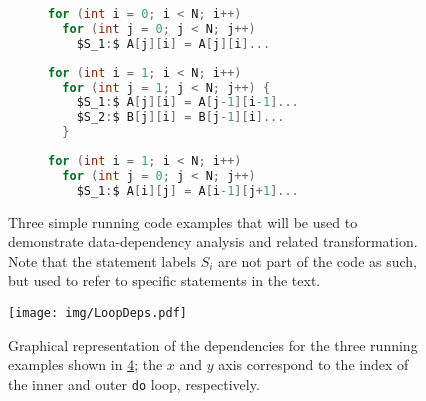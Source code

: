 \begin{figure}
  \centering

  \begin{subfigure}[b]{0.45\textwidth}
\begin{lstlisting}[language=C,mathescape=True]
for (int i = 0; i < N; i++)
  for (int j = 0; j < N; j++)
    $S_1:$ A[j][i] = A[j][i]...
\end{lstlisting}
    \caption{}
    \label{fig:data-dep-running-eg-a}
  \end{subfigure}

  \begin{subfigure}[b]{0.45\textwidth}
\begin{lstlisting}[language=C,mathescape=True]
for (int i = 1; i < N; i++)
  for (int j = 1; j < N; j++) {
    $S_1:$ A[j][i] = A[j-1][i-1]...
    $S_2:$ B[j][i] = B[j-1][i]...
  }
\end{lstlisting}
    \caption{}
    \label{fig:data-dep-running-eg-b}
  \end{subfigure}

  \begin{subfigure}[b]{0.45\textwidth}
\begin{lstlisting}[language=C,mathescape=True]
for (int i = 1; i < N; i++)
  for (int j = 0; j < N; j++)
    $S_1:$ A[i][j] = A[i-1][j+1]...
\end{lstlisting}
    \caption{}
    \label{fig:data-dep-running-eg-c}
  \end{subfigure}

  \caption{Three simple running code examples that will be used to
    demonstrate data-dependency analysis and related transformation.
    Note that the statement labels $S_{i}$ are not part of the code as
    such, but used to refer to specific statements in the text.}
  \label{fig:data-dep-running-eg}
\end{figure}

\begin{figure}
  \texttt{[image: img/LoopDeps.pdf]}
  \caption{Graphical representation of the dependencies for the three running examples shown in \cref{fig:data-dep-running-eg}; the $x$ and $y$ axis correspond to the index of the inner and outer \lstinline{do} loop, respectively.}
  \label{fig:dep-graph}
\end{figure}

